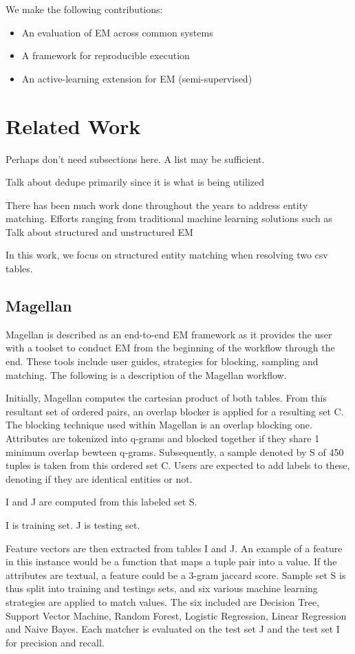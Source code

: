 \documentclass[letterpaper,twocolumn,10pt]{article}
\begin{document}
We make the following contributions:
\begin{itemize}
  \item An evaluation of EM across common systems
  \item A framework for reproducible execution
  \item An active-learning extension for EM (semi-supervised)
\end{itemize}



\section{Related Work}
Perhaps don't need subsections here. A list may be sufficient.

Talk about dedupe primarily since it is what is being utilized

There has been much work done throughout the years to address entity matching. Efforts ranging from traditional machine learning solutions such as 
Talk about structured and unstructured EM

In this work, we focus on structured entity matching when resolving two csv tables.

\subsection{Magellan}
Magellan is described as an end-to-end EM framework as it provides the user with a toolset to conduct EM from the beginning of the workflow through the end. These tools include user guides, strategies for blocking, sampling and matching. The following is a description of the Magellan workflow.

Initially, Magellan computes the cartesian product of both tables. From this resultant set of ordered pairs, an overlap blocker is applied for a resulting set C. The blocking technique used within Magellan is an overlap blocking one. Attributes are tokenized into q-grams and blocked together if they share 1 minimum overlap bewteen q-grams. Subsequently, a sample denoted by S of 450 tuples is taken from this ordered set C. Users are expected to add labels to these, denoting if they are identical entities or not. 

I and J are computed from this labeled set S.

I is training set. J is testing set.

Feature vectors are then extracted from tables I and J. An example of a feature in this instance would be a function that maps a tuple pair into a value. If the attributes are textual, a feature could be a 3-gram jaccard score. Sample set S is thus split into training and testings sets, and six various machine learning strategies are applied to match values. The six included are Decision Tree, Support Vector Machine, Random Forest, Logistic Regression, Linear Regression and Naive Bayes. Each matcher is evaluated on the test set J and the test set I for precision and recall. 
\end{document}
